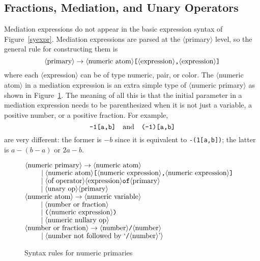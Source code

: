 \documentclass{article} %
\newcommand\descr[1]{{\langle\hbox{#1}\rangle}}
\newcommand\invisgap{\nobreak\hskip0pt\relax}
\newcommand\tdescr[1]{$\langle$\invisgap#1\invisgap$\rangle$}
\begin{document}
\subsection{Fractions, Mediation, and Unary Operators}

Mediation expressions do not appear in the basic expression
syntax of Figure~\ref{syexpr}.  Mediation expressions are parsed at the
\tdescr{primary} level, so the general rule for constructing them is
$$ \descr{primary} \rightarrow
     \descr{numeric atom} \hbox{\tt [} \descr{expression}
        \hbox{\tt ,} \descr{expression} \hbox{\tt ]}
$$
where each \tdescr{expression} can be of type numeric, pair, or color.
The \tdescr{numeric atom}\index{numeric atom?\tdescr{numeric atom}} in a
mediation expression is an extra simple type of \tdescr{numeric primary}
as shown in Figure~\ref{synprim}.  The meaning of all this is that the
initial parameter in a mediation expression needs to be parenthesized
when it is not just a variable, a positive number, or a positive
fraction.  For example,
$$ \hbox{\tt -1[a,b]} \quad {\rm and}\quad \hbox{\tt (-1)[a,b]} $$
are very different:  the former is $-b$ since it is equivalent to
{\tt -(1[a,b])}; the latter is $a-(b-a)$ or $2a-b$.

\begin{figure}[htp]
\begin{ctabbing}
$\tt \descr{numeric primary} \rightarrow \descr{numeric atom}$\\
$\tt \qquad \;|\; \descr{numeric atom}\hbox{\tt [}
  \descr{numeric expression}\hbox{\tt ,}\descr{numeric expression}\hbox{\tt ]}$\\
$\tt \qquad \;|\; \descr{of operator} \descr{expression} of \descr{primary}$\\
$\tt \qquad \;|\; \descr{unary op} \descr{primary}$\\
$\tt \descr{numeric atom} \rightarrow \descr{numeric variable}$\\
$\tt \qquad \;|\; \descr{number or fraction}$\\
$\tt \qquad \;|\; \hbox{\tt (}\descr{numeric expression}\hbox{\tt )}$\\
$\tt \qquad \;|\; \descr{numeric nullary op}$\\
$\tt \descr{number or fraction} \rightarrow \descr{number}
  \hbox{\tt /}\descr{number}$\\
$\tt \qquad \;|\; \descr{number not followed by
  `$\hbox{\tt /}\descr{number}$'}$
\end{ctabbing}
\caption{Syntax rules for numeric primaries}
\label{synprim}
\end{figure}
\end{document}
